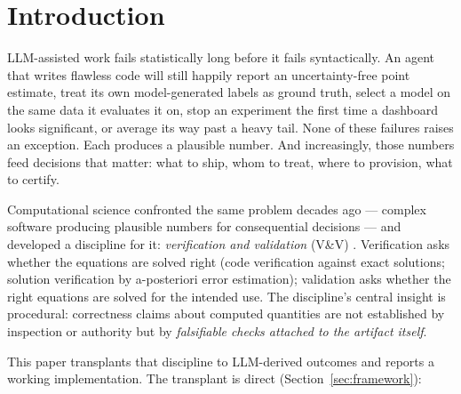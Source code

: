\documentclass[11pt,a4paper]{article}
\begin{document}
\section{Introduction}\label{sec:intro}

LLM-assisted work fails statistically long before it fails syntactically.
An agent that writes flawless code will still happily report an
uncertainty-free point estimate, treat its own model-generated labels as
ground truth, select a model on the same data it evaluates it on, stop an
experiment the first time a dashboard looks significant, or average its way
past a heavy tail. None of these failures raises an exception. Each
produces a plausible number. And increasingly, those numbers feed decisions
that matter: what to ship, whom to treat, where to provision, what to
certify.

Computational science confronted the same problem decades ago --- complex
software producing plausible numbers for consequential decisions --- and
developed a discipline for it: \emph{verification and validation} (V\&V)
\citep{roache1998,oberkampf2010}. Verification asks whether the equations
are solved right (code verification against exact solutions; solution
verification by a-posteriori error estimation); validation asks whether the
right equations are solved for the intended use. The discipline's central
insight is procedural: correctness claims about computed quantities are not
established by inspection or authority but by \emph{falsifiable checks
attached to the artifact itself}.

This paper transplants that discipline to LLM-derived outcomes and reports
a working implementation. The transplant is direct
(Section~\ref{sec:framework}):
\end{document}
